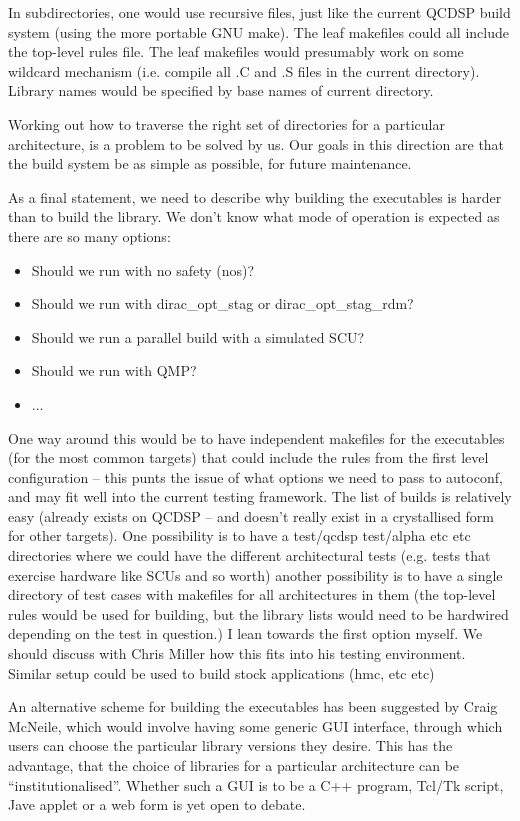 \documentclass[12pt]{article}
\begin{document}
In subdirectories, one would use recursive files, just like the current QCDSP
build system (using the more portable GNU make). The leaf makefiles
could all include the top-level rules file. The leaf makefiles would presumably
work on some wildcard mechanism (i.e. compile all .C and .S files in the current
directory).  Library names would be specified by base names of current
directory.

Working out how to traverse the right set of directories for a particular
architecture, is a problem to be solved by us. Our goals in this direction 
are that the build system be as simple as possible, for future maintenance.

As a final statement, we need to describe why building the executables is
harder than to build the library. We don't know what mode of operation is
expected as there are so many options:
\begin{itemize}
 \item Should we run with no safety (nos)?
 \item Should we run with dirac\_opt\_stag or dirac\_opt\_stag\_rdm?
 \item Should we run a parallel build with a simulated SCU?
 \item Should we run with QMP?
 \item ...
\end{itemize}
One way around this would be to have independent makefiles for the executables
(for the most common targets) that could include the rules from the first
level configuration -- this punts the issue of what options we need to pass to
autoconf, and may fit well into the current testing framework. The list of
builds is relatively easy (already exists on QCDSP -- and doesn't really exist
in a crystallised form for other targets). One possibility is to have a
test/qcdsp test/alpha etc etc directories where we could have the different
architectural tests (e.g. tests that exercise hardware like SCUs and so worth)
another possibility is to have a single directory of test cases with makefiles
for all architectures in them (the top-level rules would be used for building,
but the library lists would need to be hardwired depending on the test in
question.)  I lean towards the first option myself. We should discuss with
Chris Miller how this fits into his testing environment. Similar setup could
be used to build stock applications (hmc, etc etc)

An alternative scheme for building the executables has been suggested by
Craig McNeile, which would involve having some generic GUI interface,
through which users can choose the particular library versions they desire.
This has the advantage, that the choice of libraries for a particular
architecture can be ``institutionalised''. Whether such a GUI is to be 
a C++ program, Tcl/Tk script, Jave applet or a web form is yet open to debate.
\end{document}
